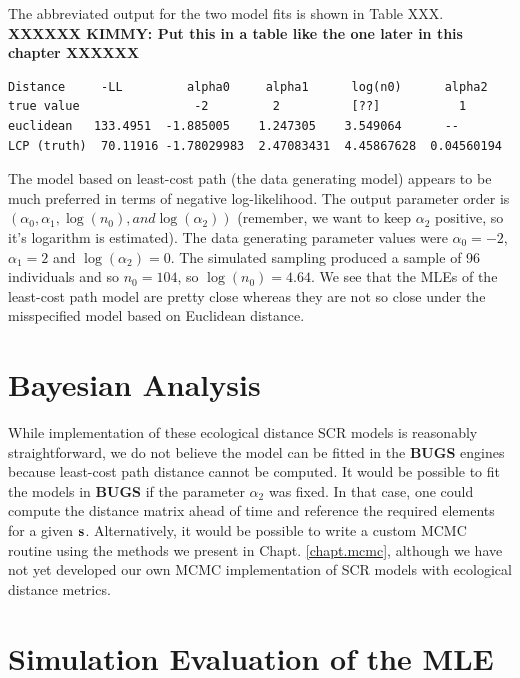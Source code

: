 The abbreviated output for the two model fits is shown in Table XXX.
{\bf XXXXXX KIMMY: Put this in a table like the one later in this chapter XXXXXX}
\begin{verbatim}
Distance     -LL         alpha0     alpha1      log(n0)      alpha2
true value                -2         2          [??]           1
euclidean   133.4951  -1.885005    1.247305    3.549064      --
LCP (truth)  70.11916 -1.78029983  2.47083431  4.45867628  0.04560194
\end{verbatim}



The model based on least-cost path (the data generating model) appears
to be much preferred in terms of negative log-likelihood.
The output parameter order is $(\alpha_{0}, \alpha_{1}, \log(n_{0}), and
\log(\alpha_{2}))$ (remember, we want to keep $\alpha_{2}$
positive, so it's logarithm is estimated).
The data generating parameter values were
$\alpha_{0} = - 2$,
$\alpha_{1} = 2$ and $\log(\alpha_{2}) = 0$.
The simulated sampling produced a sample of 96 individuals and so
$n_{0} = 104$, so $\log(n_{0}) = 4.64$. We see that the
 MLEs of the least-cost path model are pretty close whereas they are
 not so close under the misspecified model based on Euclidean distance.






\section{Bayesian Analysis}

While implementation of these ecological distance SCR models is
reasonably straightforward, we do not believe the model can be fitted
in the  {\bf BUGS} engines because least-cost path distance cannot be computed.
It would be possible to fit the models
in {\bf BUGS} if the parameter $\alpha_{2}$ was fixed. In that case,
one could compute the distance matrix ahead of time and reference the
required elements for a given ${\bf s}$.
Alternatively, it would be possible to write a custom MCMC routine
using the methods we present in Chapt. \ref{chapt.mcmc}, although we
have not yet developed our own MCMC implementation of SCR models with
ecological distance metrics.


\section{Simulation Evaluation of the MLE}

